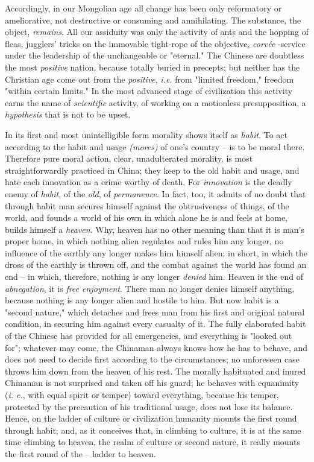 \documentclass[a4paper]{book}
\begin{document}
Accordingly, in our Mongolian age all change has been only reformatory or 
ameliorative, not destructive or consuming and annihilating. The substance, 
the object, \textit{remains}. All our assiduity was only the activity of ants 
and the hopping of fleas, jugglers' tricks on the immovable tight-rope of the 
objective, \textit{corv\'ee} -service under the leadership of the unchangeable 
or "{}eternal."{} The Chinese are doubtless the most \textit{positive} nation, 
because totally buried in precepts; but neither has the Christian age come out 
from the \textit{positive}, \textit{i.e.} from "{}limited freedom,"{} freedom 
"{}within certain limits."{} In the most advanced stage of civilization this 
activity earns the name of \textit{scientific} activity, of working on a 
motionless presupposition, a \textit{hypothesis} that is not to be upset.

In its first and most unintelligible form morality shows itself as 
\textit{habit}. To act according to the habit and usage \textit{(mores)} of 
one's country -- is to be moral there. Therefore pure moral action, clear, 
unadulterated morality, is most straightforwardly practiced in China; they 
keep to the old habit and usage, and hate each innovation as a crime worthy of 
death. For \textit{innovation} is the deadly enemy of \textit{habit}, of the 
\textit{old}, of \textit{permanence}. In fact, too, it admits of no doubt that 
through habit man secures himself against the obtrusiveness of things, of the 
world, and founds a world of his own in which alone he is and feels at home, 
builds himself a \textit{heaven}. Why, heaven has no other meaning than that 
it is man's proper home, in which nothing alien regulates and rules him any 
longer, no influence of the earthly any longer makes him himself alien; in 
short, in which the dross of the earthly is thrown off, and the combat against 
the world has found an end -- in which, therefore, nothing is any longer 
\textit{denied} him. Heaven is the end of \textit{abnegation}, it is 
\textit{free enjoyment}. There man no longer denies himself anything, because 
nothing is any longer alien and hostile to him. But now habit is a "{}second 
nature,"{} which detaches and frees man from his first and original natural 
condition, in securing him against every casualty of it. The fully elaborated 
habit of the Chinese has provided for all emergencies, and everything is 
"{}looked out for"{}; whatever may come, the Chinaman always knows how he has 
to behave, and does not need to decide first according to the circumstances; 
no unforeseen case throws him down from the heaven of his rest. The morally 
habituated and inured Chinaman is not surprised and taken off his guard; he 
behaves with equanimity (\textit{i. e.}, with equal spirit or temper) toward 
everything, because his temper, protected by the precaution of his traditional 
usage, does not lose its balance. Hence, on the ladder of culture or 
civilization humanity mounts the first round through habit; and, as it 
conceives that, in climbing to culture, it is at the same time climbing to 
heaven, the realm of culture or second nature, it really mounts the first 
round of the -- ladder to heaven.
\end{document}
